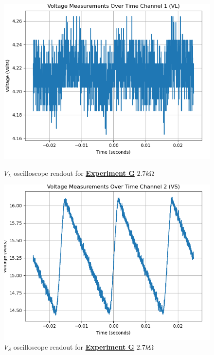 \documentclass[
	letterpaper
	12pt
]{template}
\newcommand{\bref}[2]{\textbf{\hyperref[#1]{#2}}}
\begin{document}
\begin{figure}[H]\label{data::G5}
	\centering
	\begin{minipage}[c]{0.45\textwidth}
		\centering
		\includegraphics[width=\textwidth]{figures/G/5--ch1.png}
	    \caption{$V_{L}$ oscilloscope readout for \bref{exp::G}{Experiment G} $2.7\unit{k\ohm}$ }
	\end{minipage}
	\hfill
	\begin{minipage}[c]{0.45\textwidth}
		\centering
		\includegraphics[width=\textwidth]{figures/G/5--ch2.png}
	    \caption{$V_{S}$ oscilloscope readout for \bref{exp::G}{Experiment G} $2.7\unit{k\ohm}$ }
	\end{minipage}
\end{figure}
\end{document}
